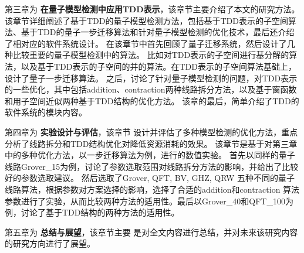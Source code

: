 
第三章为 \textbf{在量子模型检测中应用TDD表示}，该章节主要介绍了本文的研究方法。
该章节详细阐述了基于TDD的量子模型检测方法，包括基于TDD表示的子空间算法、基于TDD的量子一步迁移算法和针对量子模型检测的优化技术，最后还介绍了相对应的软件系统设计。
在该章节中首先回顾了量子迁移系统，然后设计了几种比较重要的量子模型检测中的算法。
比如对TDD表示的子空间进行基分解的算法，以及基于TDD表示的子空间的并的算法。在TDD表示的子空间算法基础上，设计了量子一步迁移算法。
之后，讨论了针对量子模型检测的问题，对TDD表示的一些优化，其中包括addition、contraction两种线路拆分方法，以及基于窗函数和用子空间近似两种基于TDD结构的优化方法。
该章的最后，简单介绍了TDD的软件系统的模块内容。

第四章为 \textbf{实验设计与评估}，该章节
设计并评估了多种模型检测的优化方法，重点分析了线路拆分和TDD结构优化对降低资源消耗的效果。
该章节是基于对第三章中的多种优化方法，以一步迁移算法为例，进行的数值实验。
首先以同样的量子线路Grover\_15为例，讨论了参数选取范围对线路拆分方法的影响，并给出了比较好的参数选取建议。
然后选取了Grover, QFT, BV, GHZ, QRW
五种不同的量子线路算法，根据参数对方案选择的影响，选择了合适的addition和contraction
算法参数进行了实验，从而比较两种方法的适用性。最后以Grover\_40和QFT\_100为例，讨论了基于TDD结构的两种方法的适用性。

第五章为 \textbf{总结与展望}，该章节主要
是对全文内容进行总结，并对未来该研究内容的研究方向进行了展望。